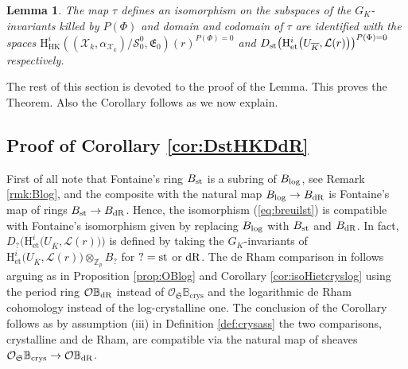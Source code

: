 \documentclass[asterisque,english]{smfart}
\newtheorem{lemma}[theo]{Lemma}
\begin{document}
\begin{lemma}\label{lemma:tauimples} The map $\tau$ defines an isomorphism on the  subspaces of the $G _K$-invariants killed by $P(\Phi)$ and domain and codomain of $\tau$ are identified with the spaces $ \mathrm{H}^i_{\mathrm{HK}}\left((\mathcal{X}_k,\alpha_{\mathcal{X}_k})/ \mathcal{S}_0^0,\mathfrak{E}_0 \right)(r)^{P(\Phi)=0}$ and $D_{\rm st}\bigl(\mathrm{H}^i_{\mathrm{et}}\bigl(U_{\overline{K}}, \mathcal{L}(r)\bigr) \bigr)^{P(\Phi)=0}$  respectively.

\end{lemma}



The rest of this section is devoted to the proof of the Lemma. This proves the Theorem. Also  the Corollary follows as we now explain.

\subsection{Proof of Corollary \ref{cor:DstHKDdR}}\label{sec:pfCorDst} First of all note that Fontaine's ring $B_{\rm st}$ is a subring of $B_{\rm log}$, see Remark \ref{rmk:Blog}, and the composite with the natural map $B_{\rm log}\to B_{\rm dR}$ is Fontaine's map of rings $B_{\rm st}\to B_{\rm dR}$. Hence, the isomorphism (\ref{eq:breuilst}) is compatible with Fontaine's isomorphism given by replacing $B_{\rm log}$ with $B_{\rm st}$ and $ B_{\rm dR}$. In fact, $D_?\bigl(\mathrm{H}^i_{\mathrm{et}}\bigl(U_{\overline{K}}, \mathcal{L}(r)\bigr) \bigr) $ is defined by taking the $G_K$-invariants of  $\mathrm{H}^i_{\mathrm{et}}\bigl(U_{\overline{K}},  \mathcal{L}(r)\bigr)\otimes_{\mathbb{Z}_p}  B_?$ for $?={\rm st}$ or ${\rm dR}$. The de Rham comparison in \cite[Thm. 3.2.7(3)]{DLLZb} follows arguing as in Proposition \ref{prop:OBlog} and Corollary \ref{cor:isoHietcryslog} using the period ring $\mathcal{O} \mathbb{B}_{\rm dR}$ instead of $\mathcal{O}_{\mathfrak{S}}\mathbb{B}_{\mathrm{crys}}$ and the logarithmic de Rham cohomology instead of the log-crystalline one. The conclusion of the Corollary follows as by assumption (iii) in Definition \ref{def:crysass} the two comparisons, crystalline and de Rham,  are compatible via the natural map of sheaves $\mathcal{O}_{\mathfrak{S}}\mathbb{B}_{\mathrm{crys}}\to \mathcal{O} \mathbb{B}_{\rm dR}$.
\end{document}
